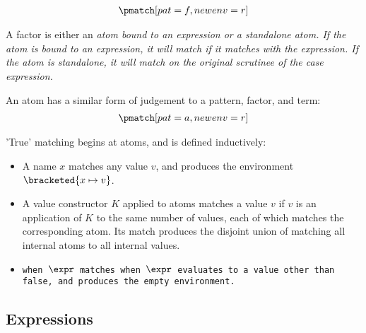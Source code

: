 \documentclass[]{article}
\begin{document}
    \begin{align*}
        \pmatch[pat=f, newenv=r]
    \end{align*}

    A factor is either an \it{atom} bound to an \it{expression} or a standalone
    \it{atom}. If the atom is bound to an expression, it will match if it
    matches with the expression. If the atom is standalone, it will match on the
    \it{original} scrutinee of the case expression.

    An atom has a similar form of judgement to a pattern, factor, and term:
    \begin{align*}
        \pmatch[pat=a, newenv=r]
    \end{align*}

    'True' matching begins at atoms, and is defined inductively: 
    \begin{itemize}
        \item A name $x$ matches any value $v$, and produces the environment 
        $\bracketed{x \mapsto v}$. 
        \item A value constructor $K$ applied to atoms  matches 
        a value $v$ if $v$ is an application of $K$ to the same number of values,
        each of which matches the corresponding atom. Its match produces 
        the disjoint union of matching all internal atoms to all internal values. 
        \item \tt{when} $\expr$ matches when $\expr$ evaluates to a value other than 
        \tt{false}, and produces the empty environment. 
    \end{itemize}






    \subsection{Expressions}
    
\end{document}
